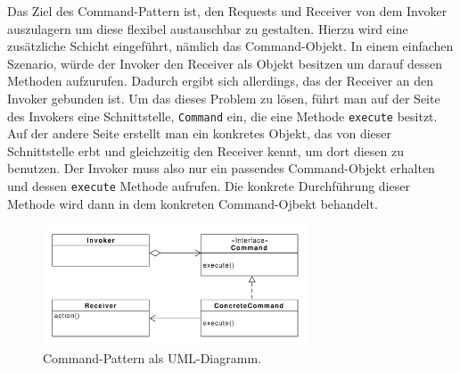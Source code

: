 Das Ziel des Command-Pattern ist, den Requests und Receiver von dem Invoker auszulagern um diese flexibel austauschbar zu gestalten. Hierzu wird eine zusätzliche Schicht eingeführt, nämlich das Command-Objekt. In einem einfachen Szenario, würde der Invoker den Receiver als Objekt besitzen um darauf dessen Methoden aufzurufen. Dadurch ergibt sich allerdings, das der Receiver an den Invoker gebunden ist. Um das dieses Problem zu lösen, führt man auf der Seite des Invokers eine Schnittstelle, \texttt{Command} ein, die eine Methode \texttt{execute} besitzt. Auf der andere Seite erstellt man ein konkretes Objekt, das von dieser Schnittstelle erbt und gleichzeitig den Receiver kennt, um dort diesen zu benutzen. Der Invoker muss also nur ein passendes Command-Objekt erhalten und  dessen \texttt{execute} Methode aufrufen. Die konkrete Durchführung dieser Methode wird  dann in dem konkreten Command-Ojbekt behandelt. 


\begin{figure}[htbp]
\centering
\includegraphics[width=0.7\textwidth]{./paper/command/command}
\caption{Command-Pattern als UML-Diagramm.}
\label{commanddiagramm}
\end{figure} 